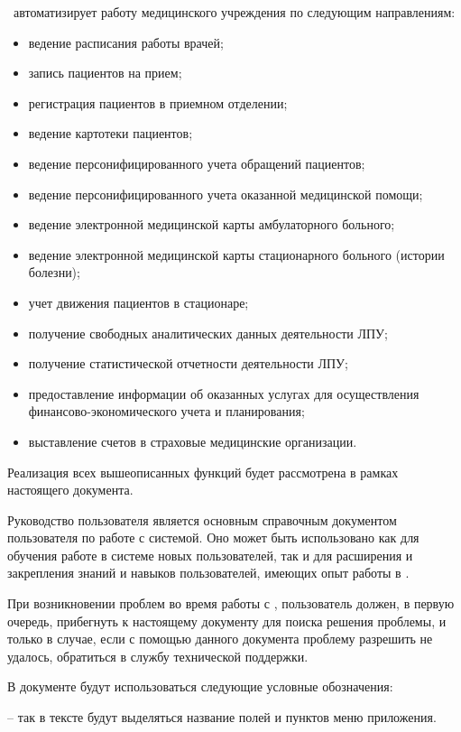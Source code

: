 \tmis~автоматизирует работу медицинского учреждения по следующим направлениям:
\begin{itemize}
 	\item ведение расписания работы врачей;
 	\item запись пациентов на прием;
 	\item регистрация пациентов в приемном отделении;
 	\item ведение картотеки пациентов;
 	\item ведение персонифицированного учета обращений пациентов;
 	\item ведение персонифицированного учета оказанной медицинской помощи;
 	\item ведение электронной медицинской карты амбулаторного больного;
 	\item ведение электронной медицинской карты стационарного больного (истории болезни);
 	\item учет движения пациентов в стационаре;
    \item получение свободных аналитических данных деятельности ЛПУ;
 	\item получение статистической отчетности деятельности ЛПУ;
 	\item предоставление информации об оказанных услугах для осуществления финансово-экономического учета и планирования;
 	\item выставление счетов в страховые медицинские организации.
\end{itemize}

Реализация всех вышеописанных функций будет рассмотрена в рамках настоящего документа.

\newpage
{}

 Руководство пользователя является основным справочным документом пользователя по работе с системой. Оно может быть использовано как для обучения работе в системе новых пользователей, так и для расширения и закрепления знаний и навыков пользователей, имеющих опыт работы в \tmis .

 При возникновении проблем во время работы с \tmis , пользователь должен, в первую очередь, прибегнуть к настоящему документу для поиска решения проблемы, и только в случае, если с помощью данного документа проблему разрешить не удалось, обратиться в службу технической поддержки.

 В документе будут использоваться следующие условные обозначения:  \vspace*{0.5em}
 
  -- так в тексте будут выделяться название полей и пунктов меню приложения.
 

